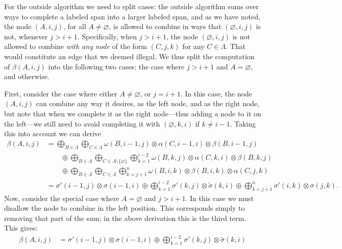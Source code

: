     For the outside algorithm we need to split cases: the outside algorithm sums over ways to complete a labeled span into a larger labeled span, and as we have noted, the node $(A, i, j)$, for all $A \neq \varnothing$, is allowed to combine in ways that $(\varnothing, i, j)$ is not, whenever $j > i + 1$. Specifically, when $j > i + 1$, the node $(\varnothing, i, j)$ is not allowed to combine \textit{with any node} of the form $(C, j, k)$ for any $C \in \Lambda$. That would constitute an edge that we deemed illegal. We thus split the computation of $\beta(A, i, j)$ into the following two cases: the case where $j > i + 1$ and $ A = \varnothing$, and otherwise.

    First, consider the case where either $A \neq \varnothing$, or $j = i + 1$. In this case, the node $(A, i, j)$ can combine any way it desires, as the left node, and as the right node, but note that when we complete it as the right node---thus adding a node to it on the left---we still need to avoid completing it with $(\varnothing, k, i)$ if $k \neq i-1$. Taking this into account we can derive
    \begin{align*}
      \beta(A, i, j)
        &= \bigoplus_{B \in \Lambda} \bigoplus_{C \in \Lambda}  \omega(B, i-1, j) \otimes \alpha(C, i-1, i) \otimes \beta(B, i-1, j)  \\
          &\qquad \oplus \bigoplus_{B \in \Lambda} \bigoplus_{C \in \Lambda \setminus \{ \varnothing \}} \bigoplus_{k=1}^{i-2} \omega(B, k, j) \otimes \alpha(C, k, i) \otimes \beta(B, k, j) \\
          &\qquad \oplus \bigoplus_{B \in \Lambda} \bigoplus_{C \in \Lambda} \bigoplus_{k=j+1}^{n} \omega(B, i, k) \otimes \beta(B, i, k) \otimes \alpha(C, j, k)  \\
        &= \sigma'(i-1, j) \otimes \sigma(i-1, i) \oplus \bigoplus_{k=1}^{i-2} \sigma'(k, j) \otimes \tilde{\sigma}(k, i) \oplus \bigoplus_{k=j+1}^{n} \sigma'(i, k) \otimes \sigma(j, k).
    \end{align*}
    Now, consider the special case where $ A = \varnothing$ and $j > i + 1$. In this case we must disallow the node to combine in the left position. This corresponds simply to removing that part of the sum; in the above derivation this is the third term. This gives:
    \begin{align*}
      \beta(A, i, j) &=
        \sigma'(i-1, j) \otimes \sigma(i-1, i) \oplus \displaystyle\bigoplus_{k=1}^{i-2} \sigma'(k, j) \otimes \tilde{\sigma}(k, i)
    \end{align*}

